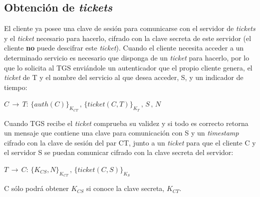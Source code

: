 \subsection{Obtenci\'on de {\it tickets}}
El cliente ya posee una clave de sesi\'on para comunicarse con el servidor de
{\it tickets} y el {\it ticket} necesario para hacerlo, cifrado con la clave 
secreta de este servidor (el cliente {\bf no} puede descifrar este {\it 
ticket}). Cuando el cliente necesita acceder a un determinado servicio es 
necesario que disponga de un {\it ticket} para hacerlo, por lo que lo solicita 
al TGS envi\'andole un autenticador que el propio cliente genera, el {\it
ticket} de T y el nombre del servicio al que desea acceder, S, y un indicador
de tiempo:
\begin{center}
$C\,\rightarrow\, T:\,\{auth(C)\}_{K_{CT}}\, ,\, \{ticket(C,T)\}_{K_{T}}\, ,\, S\, ,\, N$
\end{center}
Cuando TGS recibe el {\it ticket} comprueba su validez y si todo es correcto
retorna un mensaje que contiene una clave para comunicaci\'on con S y un {\it 
timestamp} cifrado con la clave de sesi\'on del par CT, junto a un {\it ticket} 
para que el cliente C y el servidor S se puedan comunicar cifrado con la 
clave secreta del servidor:
\begin{center}
$T\,\rightarrow\, C:\,\{K_{CS},N\}_{K_{CT}}\, ,\, \{ticket(C,S)\}_{K_{S}}$
\end{center}
C s\'olo podr\'a obtener $K_{CS}$ si conoce la clave secreta, $K_{CT}$.
